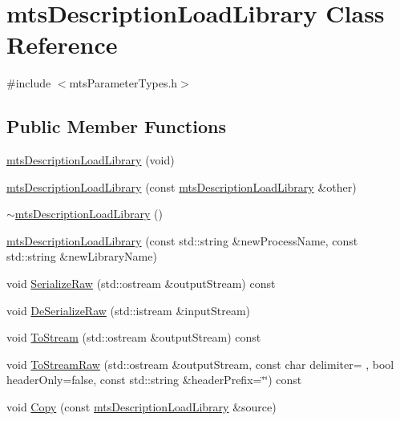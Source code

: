 \hypertarget{classmts_description_load_library}{}\section{mts\+Description\+Load\+Library Class Reference}
\label{classmts_description_load_library}


{\ttfamily \#include $<$mts\+Parameter\+Types.\+h$>$}

\subsection*{Public Member Functions}
\begin{DoxyCompactItemize}
\item 
\hyperlink{classmts_description_load_library_aca97c3b2da96cf06cd8bdbada628ad53}{mts\+Description\+Load\+Library} (void)
\item 
\hyperlink{classmts_description_load_library_a14d7be4c7342633a4f0f0d889a6fe5f3}{mts\+Description\+Load\+Library} (const \hyperlink{classmts_description_load_library}{mts\+Description\+Load\+Library} \&other)
\item 
\hyperlink{classmts_description_load_library_a2ca70745f7f55957d9d5c74dbc74b0ab}{$\sim$mts\+Description\+Load\+Library} ()
\item 
\hyperlink{classmts_description_load_library_a6ee5c15f87a4c771ceb4c691f8372bf3}{mts\+Description\+Load\+Library} (const std\+::string \&new\+Process\+Name, const std\+::string \&new\+Library\+Name)
\item 
void \hyperlink{classmts_description_load_library_a25fd1b50c1b399087e79a8f7a7497068}{Serialize\+Raw} (std\+::ostream \&output\+Stream) const 
\item 
void \hyperlink{classmts_description_load_library_a800236e5a4c104de355009f7f90b7142}{De\+Serialize\+Raw} (std\+::istream \&input\+Stream)
\item 
void \hyperlink{classmts_description_load_library_affea134de125abe17ca455d20140875d}{To\+Stream} (std\+::ostream \&output\+Stream) const 
\item 
void \hyperlink{classmts_description_load_library_af52d1a80c676782b1132f6fabb3d8e1a}{To\+Stream\+Raw} (std\+::ostream \&output\+Stream, const char delimiter= \textquotesingle{} \textquotesingle{}, bool header\+Only=false, const std\+::string \&header\+Prefix=\char`\"{}\char`\"{}) const 
\item 
void \hyperlink{classmts_description_load_library_a6f59d73e56b0e224aa5aa462a0ed2534}{Copy} (const \hyperlink{classmts_description_load_library}{mts\+Description\+Load\+Library} \&source)

\end{DoxyCompactItemize}
